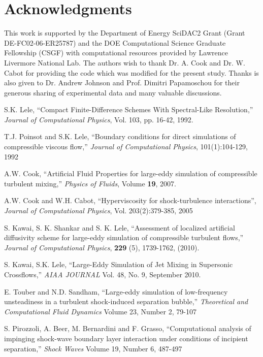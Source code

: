 \documentclass[]{aiaa-tc}%
\begin{document}
\section*{Acknowledgments}

This work is supported by the Department of Energy SciDAC2 Grant (Grant DE-FC02-06-ER25787) and the DOE Computational Science Graduate Fellowship (CSGF) with computational resources provided by Lawrence Livermore National Lab.  The authors wish to thank Dr. A. Cook and Dr. W. Cabot for providing the code which was modified for the present study.  Thanks is also given to Dr. Andrew Johnson and Prof. Dimitri Papamoschou for their generous sharing of experimental data and many valuable discussions.

\begin{thebibliography}{10}%
 
 	S.K. Lele, ``Compact Finite-Difference Schemes With Spectral-Like Resolution,'' \emph{Journal of Computational
	Physics}, Vol. 103, pp. 16-42, 1992.
	
	T.J. Poinsot and S.K. Lele, ``Boundary conditions for direct simulations of compressible viscous flow,'' \emph{Journal of Computational Physics}, 101(1):104-129, 1992

 	A.W. Cook,  ``Artificial Fluid Properties for large-eddy simulation of compressible turbulent mixing,'' \emph{Physics of Fluids}, Volume {\bf 19}, 2007.
	
	A.W. Cook and W.H. Cabot, ``Hyperviscosity for shock-turbulence interactions'', \emph{Journal of Computational Physics}, Vol. 203(2):379-385, 2005
 
 	S. Kawai, S. K. Shankar and S. K. Lele, ``Assessment of localized artificial diffusivity scheme for large-eddy simulation of compressible turbulent flows,'' \emph{Journal of Computational Physics}, {\bf 		229} (5), 1739-1762, (2010).
	
	S. Kawai, S.K. Lele, ``Large-Eddy Simulation of Jet Mixing in Supersonic Crossflows,'' \emph{AIAA JOURNAL} Vol. 48, No. 9, September 2010.
	
 	E. Touber and N.D. Sandham, ``Large-eddy simulation of low-frequency unsteadiness in a turbulent shock-induced separation bubble,'' \emph{Theoretical and Computational Fluid Dynamics} Volume 23, Number 2, 79-107

 	S. Pirozzoli, A. Beer, M. Bernardini and F. Grasso, ``Computational analysis of impinging shock-wave boundary layer interaction under conditions of incipient separation,'' \emph{Shock Waves} Volume 19, Number 6, 487-497


\end{thebibliography}
\end{document}
